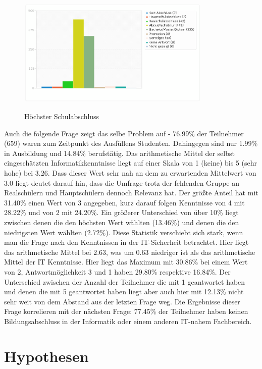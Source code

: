 \begin{figure}[H]
\centering
\includegraphics[scale=0.55]{images/schulabschluss}\\
\caption{Höchster Schulabschluss}\label{schulabschluss}
\end{figure}
Auch die folgende Frage zeigt das selbe Problem auf - 76.99\% der Teilnehmer (659) waren zum Zeitpunkt des Ausfüllens Studenten. Dahingegen sind nur 1.99\% in Ausbildung und 14.84\% berufstätig.
Das arithmetische Mittel der selbst eingeschätzten Informatikkenntnisse liegt auf einer Skala von 1 (keine) bis 5 (sehr hohe) bei 3.26. Dass dieser Wert sehr nah an dem zu erwartenden Mittelwert von 3.0 liegt deutet darauf hin, dass die Umfrage trotz der fehlenden Gruppe an Realschülern und Hauptschülern dennoch Relevanz hat. Der größte Anteil hat mit 31.40\% einen Wert von 3 angegeben, kurz darauf folgen Kenntnisse von 4 mit 28.22\% und von 2 mit 24.20\%. Ein größerer Unterschied von über 10\% liegt zwischen denen die den höchsten Wert wählten (13.46\%) und denen die den niedrigsten Wert wählten (2.72\%).
Diese Statistik verschiebt sich stark, wenn man die Frage nach den Kenntnissen in der IT-Sicherheit betrachtet. Hier liegt das arithmetische Mittel bei 2.63, was um 0.63 niedriger ist als das arithmetische Mittel der IT Kenntnisse. Hier liegt das Maximum mit 30.86\% bei einem Wert von 2, Antwortmöglichkeit 3 und 1 haben 29.80\% respektive 16.84\%. Der Unterschied zwischen der Anzahl der Teilnehmer die mit 1 geantwortet haben und denen die mit 5 geantwortet haben liegt aber auch hier mit 12.13\% nicht sehr weit von dem Abstand aus der letzten Frage weg.
Die Ergebnisse dieser Frage korrelieren mit der nächsten Frage: 77.45\% der Teilnehmer haben keinen Bildungsabschluss in der Informatik oder einem anderen IT-nahem Fachbereich.

\section{Hypothesen}

